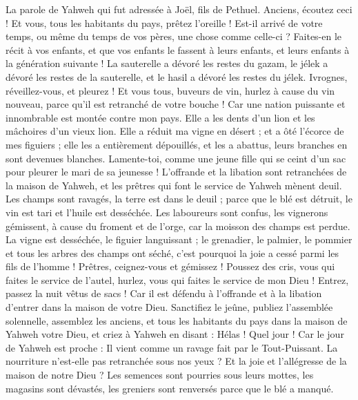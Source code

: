 \begin{multicols}{2}
\VerseOne{}La parole de Yahweh qui fut adressée à Joël, fils de Pethuel.
Anciens, écoutez ceci ! Et vous, tous les habitants du pays, prêtez l'oreille ! Est-il arrivé de votre temps, ou même du temps de vos pères, une chose comme celle-ci ?
Faites-en le récit à vos enfants, et que vos enfants le fassent à leurs enfants, et leurs enfants à la génération suivante !
La sauterelle a dévoré les restes du gazam, le jélek a dévoré les restes de la sauterelle, et le hasil a dévoré les restes du jélek.
Ivrognes, réveillez-vous, et pleurez ! Et vous tous, buveurs de vin, hurlez à cause du vin nouveau, parce qu'il est retranché de votre bouche !
Car une nation puissante et innombrable est montée contre mon pays. Elle a les dents d'un lion et les mâchoires d'un vieux lion.
Elle a réduit ma vigne en désert ; et a ôté l'écorce de mes figuiers ; elle les a entièrement dépouillés, et les a abattus, leurs branches en sont devenues blanches.
Lamente-toi, comme une jeune fille qui se ceint d'un sac pour pleurer le mari de sa jeunesse !
L'offrande et la libation sont retranchées de la maison de Yahweh, et les prêtres qui font le service de Yahweh mènent deuil.
Les champs sont ravagés, la terre est dans le deuil ; parce que le blé est détruit, le vin est tari et l'huile est desséchée.
Les laboureurs sont confus, les vignerons gémissent, à cause du froment et de l'orge, car la moisson des champs est perdue.
La vigne est desséchée, le figuier languissant ; le grenadier, le palmier, le pommier et tous les arbres des champs ont séché, c'est pourquoi la joie a cessé parmi les fils de l'homme !
Prêtres, ceignez-vous et gémissez ! Poussez des cris, vous qui faites le service de l'autel, hurlez, vous qui faites le service de mon Dieu ! Entrez, passez la nuit vêtus de sacs ! Car il est défendu à l'offrande et à la libation d'entrer dans la maison de votre Dieu.
Sanctifiez le jeûne, publiez l'assemblée solennelle, assemblez les anciens, et tous les habitants du pays dans la maison de Yahweh votre Dieu, et criez à Yahweh en disant :
Hélas ! Quel jour ! Car le jour de Yahweh est proche : Il vient comme un ravage fait par le Tout-Puissant.
La nourriture n'est-elle pas retranchée sous nos yeux ? Et la joie et l'allégresse de la maison de notre Dieu ?
Les semences sont pourries sous leurs mottes, les magasins sont dévastés, les greniers sont renversés parce que le blé a manqué.

\end{multicols}
